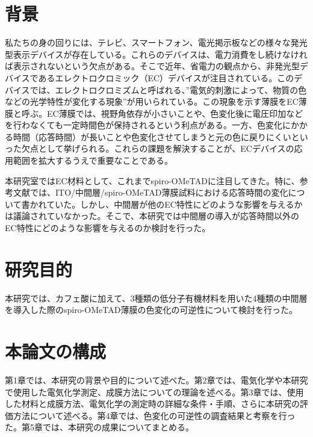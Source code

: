 \section{背景}
私たちの身の回りには、テレビ、スマートフォン、電光掲示板などの様々な発光型表示デバイスが存在している。これらのデバイスは、電力消費をし続けなければ表示されないという欠点がある。そこで近年、省電力の観点から、非発光型デバイスであるエレクトロクロミック（EC）デバイスが注目されている。このデバイスでは、エレクトロクロミズムと呼ばれる、”電気的刺激によって、物質の色などの光学特性が変化する現象”が用いられている。この現象を示す薄膜をEC薄膜と呼ぶ。EC薄膜では、視野角依存が小さいことや、色変化後に電圧印加などを行わなくても一定時間色が保持されるという利点がある。一方、色変化にかかる時間（応答時間）が長いことや色変化させてしまうと元の色に戻りにくいといった欠点として挙げられる。これらの課題を解決することが、ECデバイスの応用範囲を拡大するうえで重要なことである。

本研究室ではEC材料として、これまでspiro-OMeTADに注目してきた。{\cite{小林優心,片山壮介_卒,片山壮介_修}}特に、参考文献{\cite{片山壮介_修}}では、ITO/中間層/spiro-OMeTAD薄膜試料における応答時間の変化について書かれていた。しかし、中間層が他のEC特性にどのような影響を与えるかは議論されていなかった。そこで、本研究では中間層の導入が応答時間以外のEC特性にどのような影響を与えるのか検討を行った。

\section{研究目的}
本研究では、カフェ酸に加えて、3種類の低分子有機材料を用いた4種類の中間層を導入した際のspiro-OMeTAD薄膜の色変化の可逆性について検討を行った。

\section{本論文の構成}
第1章では、本研究の背景や目的について述べた。第2章では、電気化学や本研究で使用した電気化学測定、成膜方法についての理論を述べる。第3章では、使用した材料と成膜方法、電気化学の測定時の詳細な条件・手順、さらに本研究の評価方法について述べる。第4章では、色変化の可逆性の調査結果と考察を行った。第5章では、本研究の成果についてまとめる。